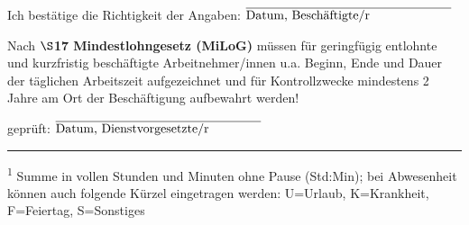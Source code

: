 \documentclass[]{scrartcl}
\newcommand{\headentry}[1]{\parbox{18.6cm}{#1}}
\begin{document}
	\par \bigskip \bigskip \medskip
	\headentry{\large Ich bestätige die Richtigkeit der Angaben: \hspace*{\fill} $\overline{{\parbox{5.75cm}{\normalsize Datum, Beschäftigte/r} } }$ } \par \medskip
	\headentry{\normalsize Nach \textbf{$\S$17 Mindestlohngesetz (MiLoG)} müssen für geringfügig entlohnte und kurzfristig beschäftigte Arbeitnehmer/innen u.a. Beginn, Ende und Dauer der täglichen Arbeitszeit aufgezeichnet und für Kontrollzwecke mindestens 2 Jahre am Ort der Beschäftigung aufbewahrt werden!} \par \bigskip \bigskip
	\headentry{\hspace*{\fill} geprüft: $\overline{{\parbox{5.75cm}{\normalsize Datum, Dienstvorgesetzte/r} } }$} \par \medskip
	\rule{6cm}{0.2pt} \par \smallskip
	\headentry{\textsuperscript{1} Summe in vollen Stunden und Minuten ohne Pause (Std:Min); bei Abwesenheit können auch folgende Kürzel eingetragen werden: U=Urlaub, K=Krankheit, F=Feiertag, S=Sonstiges}

	\SetBgPosition{-2.4cm, -29.2cm}
\end{document}

